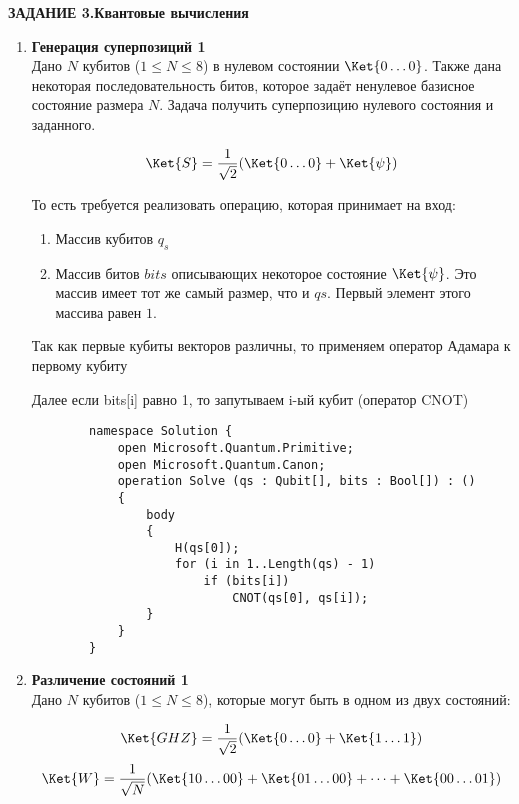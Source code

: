 \documentclass{article}
\begin{document}
    \textbf{ЗАДАНИЕ 3.Квантовые вычисления}\\
    \begin{enumerate}
        \item \textbf{Генерация суперпозиций 1}\\
        Дано $N$ кубитов ($1 \le N \le 8$) в нулевом состоянии $\Ket{0\dots0}$. Также дана некоторая последовательность битов, которое задаёт ненулевое базисное состояние размера $N$. Задача получить суперпозицию нулевого состояния и заданного.

        $$\Ket{S} = \frac{1}{\sqrt2}(\Ket{0\dots0} +\Ket{\psi})$$

        То есть требуется реализовать операцию, которая принимает на вход:

        \begin{enumerate}
            \item Массив кубитов $q_s$
            \item Массив битов $bits$ описывающих некоторое состояние $\Ket{\psi}$. Это массив имеет тот же самый размер, что и $qs$. Первый элемент этого массива равен $1$.
        \end{enumerate}

        Так как первые кубиты векторов различны, то применяем оператор Адамара к первому кубиту

        Далее если bits[i] равно 1, то запутываем i-ый кубит (оператор CNOT)

        \begin{lstlisting}
        namespace Solution {
            open Microsoft.Quantum.Primitive;
            open Microsoft.Quantum.Canon;
            operation Solve (qs : Qubit[], bits : Bool[]) : ()
            {
                body
                {
                    H(qs[0]);
                    for (i in 1..Length(qs) - 1)
                        if (bits[i]) 
                            CNOT(qs[0], qs[i]);
                }
            }
        }
        \end{lstlisting}
        
        \item \textbf{Различение состояний 1}\\
        Дано $N$ кубитов ($1 \le N \le 8$), которые могут быть в одном из двух состояний:

        $$\Ket{GHZ} = \frac{1}{\sqrt2}(\Ket{0\dots0} +\Ket{1\dots1})$$
        $$\Ket{W} = \frac{1}{\sqrt N}(\Ket{10\dots00}+\Ket{01\dots00} + \dots +\Ket{00\dots01})$$


\end{enumerate}
\end{document}
